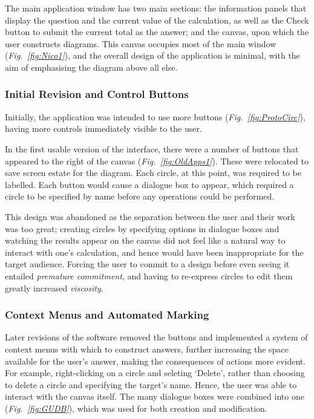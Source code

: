 \documentclass[12pt,twoside,notitlepage,xetex]{report}
\begin{document}
{The main application window has two main sections: the information panels that display the question and the current value of the calculation, as well as the {\sfapp Check} button to submit the current total as the answer; and the canvas, upon which the user constructs diagrams.  This canvas occupies most of the main window (\emph{Fig.~\ref{fig:Nico1}}), and the overall design of the application is minimal, with the aim of emphasising the diagram above all else.

\subsubsection{Initial Revision and Control Buttons}

Initially, the application was intended to use more buttons (\emph{Fig.~\ref{fig:ProtoCirc}}), having more controls immediately visible to the user.

In the first usable version of the interface, there were a number of buttons that appeared to the right of the canvas (\emph{Fig.~\ref{fig:OldApps1}}).  These were relocated to save screen estate for the diagram.  Each circle, at this point, was required to be labelled.  Each button would cause a dialogue box to appear, which required a circle to be specified by name before any operations could be performed.

This design was abandoned as the separation between the user and their work was too great; creating circles by specifying options in dialogue boxes and watching the results appear on the canvas did not feel like a natural way to interact with one's calculation, and hence would have been inappropriate for the target audience.  Forcing the user to commit to a design before even seeing it entailed \emph{premature commitment}, and having to re-express circles to edit them greatly increased \emph{viscosity}.

\subsubsection{Context Menus and Automated Marking}

Later revisions of the software removed the buttons and implemented a system of context menus with which to construct answers, further increasing the space available for the user's answer, making the consequences of actions more evident.  For example, right-clicking on a circle and seleting `Delete', rather than choosing to delete a circle and specifying the target's name.  Hence, the user was able to interact with the canvas itself.  The many dialogue boxes were combined into one (\emph{Fig.~\ref{fig:GUDB}}), which was used for both creation and modification.

}
\end{document}
